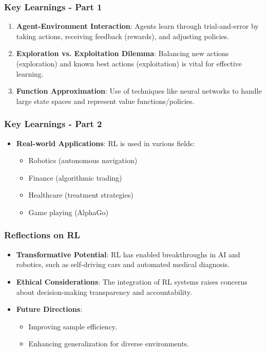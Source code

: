 \documentclass{beamer}
\begin{document}
\begin{frame}[fragile]
    \frametitle{Key Learnings - Part 1}
    
    \begin{enumerate}
        \item \textbf{Agent-Environment Interaction}: 
        Agents learn through trial-and-error by taking actions, receiving feedback (rewards), and adjusting policies.
        
        \item \textbf{Exploration vs. Exploitation Dilemma}: 
        Balancing new actions (exploration) and known best actions (exploitation) is vital for effective learning.

        \item \textbf{Function Approximation}: 
        Use of techniques like neural networks to handle large state spaces and represent value functions/policies.
    \end{enumerate}
\end{frame}

\begin{frame}[fragile]
    \frametitle{Key Learnings - Part 2}
    
    \begin{itemize}
        \item \textbf{Real-world Applications}: RL is used in various fields:
        \begin{itemize}
            \item Robotics (autonomous navigation)
            \item Finance (algorithmic trading)
            \item Healthcare (treatment strategies)
            \item Game playing (AlphaGo)
        \end{itemize}
    \end{itemize}
\end{frame}

\begin{frame}[fragile]
    \frametitle{Reflections on RL}
    \begin{itemize}
        \item \textbf{Transformative Potential}: 
        RL has enabled breakthroughs in AI and robotics, such as self-driving cars and automated medical diagnosis.
        
        \item \textbf{Ethical Considerations}: 
        The integration of RL systems raises concerns about decision-making transparency and accountability.
        
        \item \textbf{Future Directions}:
        \begin{itemize}
            \item Improving sample efficiency.
            \item Enhancing generalization for diverse environments.
        \end{itemize}
    \end{itemize}
\end{frame}
\end{document}
